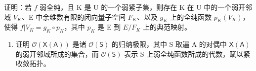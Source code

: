   证明：若 \(f\) 弱全纯，且 K 是 U 的一个弱紧子集，则存在 K 在 U 中的一个弱开邻域 \(V_K\)、E 中余维数有限的闭向量子空间 \(F_K\)、以及 \(g_K\) 上的全纯函数 \(p_K(V_K)\)，使得 \(f|V_K = g_K \circ p_K\)，其中 \(p_K\) 是 E 到 \(E/F_K\) 上的典范映射。

\begin{enumerate}
\def\labelenumi{\alph{enumi})}
\setcounter{enumi}{4}
\tightlist
\item
  证明 \(\mathcal{O}(\mathsf{X}(\mathsf{A}))\) 是诸 \(\mathcal{O}(\mathsf{S})\) 的归纳极限，其中 S 取遍 A 的对偶中 \(\mathsf{X}(\mathsf{A})\) 的弱开邻域所成的集合，而 \(\mathcal{O}(\mathsf{S})\) 表示 S 上弱全纯函数所成的代数，赋以紧收敛拓扑。
\end{enumerate}

